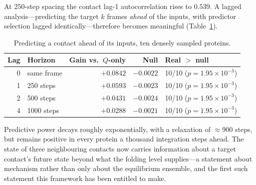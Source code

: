 At 250-step spacing the contact lag-1 autocorrelation rises to $0.539$.  A
lagged analysis---predicting the target $k$ frames \emph{ahead} of the inputs,
with predictor selection lagged identically---therefore becomes meaningful
(Table~\ref{tab:cl-lag}).

\begin{table}[htbp]
\centering
\caption{Predicting a contact ahead of its inputs, ten densely sampled
proteins.}
\label{tab:cl-lag}
\begin{tabular}{rlrrl}
\toprule
Lag & Horizon & Gain vs.\ $Q$-only & Null & Real $>$ null \\
\midrule
0 & same frame  & $+0.0842$ & $-0.0022$ & 10/10 ($p = 1.95\times10^{-3}$) \\
1 & 250 steps   & $+0.0593$ & $-0.0023$ & 10/10 ($p = 1.95\times10^{-3}$) \\
2 & 500 steps   & $+0.0431$ & $-0.0024$ & 10/10 ($p = 1.95\times10^{-3}$) \\
4 & 1000 steps  & $+0.0288$ & $-0.0021$ & 10/10 ($p = 1.95\times10^{-3}$) \\
\bottomrule
\end{tabular}
\end{table}

Predictive power decays roughly exponentially, with a relaxation of
$\approx 900$ steps, but remains positive in every protein a thousand
integration steps ahead.  The state of three neighbouring contacts now carries
information about a target contact's future state beyond what the folding level
supplies---a statement about mechanism rather than only about the equilibrium
ensemble, and the first such statement this framework has been entitled to
make.
